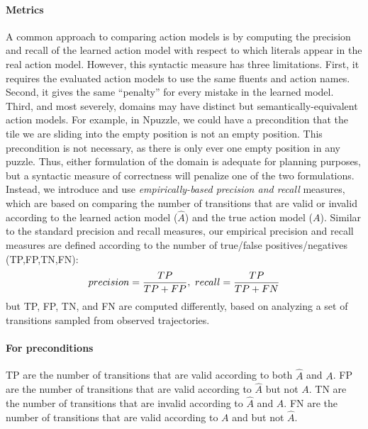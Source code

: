 \documentclass[letterpaper]{article} %
\begin{document}
\paragraph{Metrics} 
A common approach to comparing action models is by computing the precision and recall of the learned action model with respect to which literals appear in the real action model. However, this syntactic measure has three limitations. First, it requires the evaluated action models to use the same fluents and action names. Second, it gives the same ``penalty'' for every mistake in the learned model. Third, and most severely, domains may have distinct but semantically-equivalent action models. For example, in Npuzzle, we could have a precondition that the tile we are sliding into the empty position is not an empty position. This precondition is not necessary, as there is only ever one empty position in any puzzle. Thus, either formulation of the domain is adequate for planning purposes, but a syntactic measure of correctness will penalize one of the two formulations. Instead, we introduce and use 
\textit{empirically-based precision and recall} measures, which are based on comparing the number of transitions that are valid or invalid according to the learned action model ($\hat{A}$) and the true action model ($A$). 
Similar to the standard precision and recall measures, our empirical precision and recall measures are defined according to the number of true/false positives/negatives (TP,FP,TN,FN): 
\begin{equation}\small
precision = \frac{TP}{TP + FP},~
recall = \frac{TP}{TP + FN}
\end{equation}
but TP, FP, TN, and FN are computed differently, based on analyzing a set of transitions sampled from observed trajectories.  
\paragraph{For preconditions} 
TP are the number of transitions that are valid according to both $\hat{A}$ and $A$. 
FP are the number of transitions that are valid according to $\hat{A}$ but not $A$.
TN are the number of transitions that are invalid according to $\hat{A}$ and $A$. 
FN are the number of transitions that are valid according to $A$ and but not $\hat{A}$. 
\end{document}
